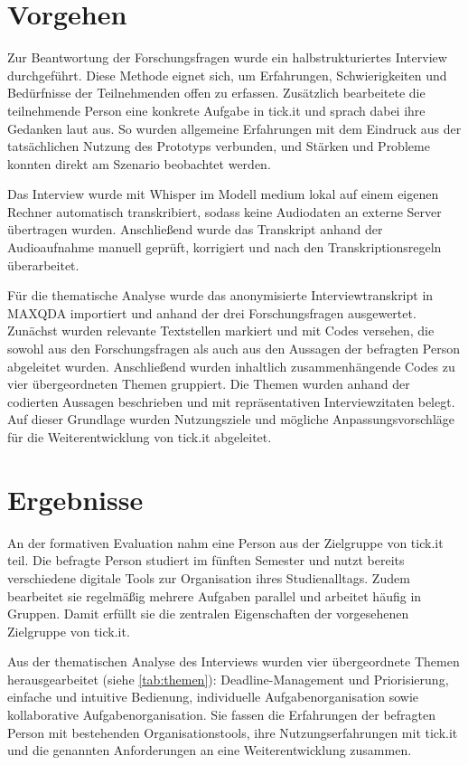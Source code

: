 \section{Vorgehen}
\label{sec:pt-vorgehen}

Zur Beantwortung der Forschungsfragen wurde ein halbstrukturiertes Interview durchgeführt.
Diese Methode eignet sich, um Erfahrungen, Schwierigkeiten und Bedürfnisse der Teilnehmenden offen zu erfassen.
Zusätzlich bearbeitete die teilnehmende Person eine konkrete Aufgabe in tick.it und sprach dabei ihre Gedanken laut aus.
So wurden allgemeine Erfahrungen mit dem Eindruck aus der tatsächlichen Nutzung des Prototyps verbunden, und Stärken und Probleme konnten direkt am Szenario beobachtet werden.

Das Interview wurde mit Whisper \parencite{whisper2025} im Modell medium lokal auf einem eigenen Rechner automatisch transkribiert, sodass keine Audiodaten an externe Server übertragen wurden.
Anschließend wurde das Transkript anhand der Audioaufnahme manuell geprüft, korrigiert und nach den Transkriptionsregeln überarbeitet.

Für die thematische Analyse wurde das anonymisierte Interviewtranskript in MAXQDA \parencite{maxqda2026} importiert und anhand der drei Forschungsfragen ausgewertet.
Zunächst wurden relevante Textstellen markiert und mit Codes versehen, die sowohl aus den Forschungsfragen als auch aus den Aussagen der befragten Person abgeleitet wurden.
Anschließend wurden inhaltlich zusammenhängende Codes zu vier übergeordneten Themen gruppiert.
Die Themen wurden anhand der codierten Aussagen beschrieben und mit repräsentativen Interviewzitaten belegt.
Auf dieser Grundlage wurden Nutzungsziele und mögliche Anpassungsvorschläge für die Weiterentwicklung von tick.it abgeleitet.

\section{Ergebnisse}
\label{sec:pt-ergebnisse}

An der formativen Evaluation nahm eine Person aus der Zielgruppe von tick.it teil.
Die befragte Person studiert im fünften Semester und nutzt bereits verschiedene digitale Tools zur Organisation ihres Studienalltags.
Zudem bearbeitet sie regelmäßig mehrere Aufgaben parallel und arbeitet häufig in Gruppen.
Damit erfüllt sie die zentralen Eigenschaften der vorgesehenen Zielgruppe von tick.it.

Aus der thematischen Analyse des Interviews wurden vier übergeordnete Themen herausgearbeitet (siehe \cref{tab:themen}): Deadline-Management und Priorisierung, einfache und intuitive Bedienung, individuelle Aufgabenorganisation sowie kollaborative Aufgabenorganisation.
Sie fassen die Erfahrungen der befragten Person mit bestehenden Organisationstools, ihre Nutzungserfahrungen mit tick.it und die genannten Anforderungen an eine Weiterentwicklung zusammen.

